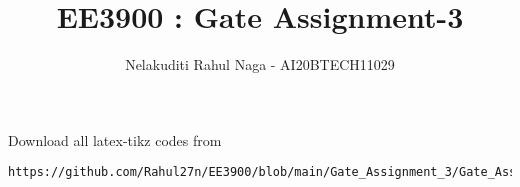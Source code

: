 \documentclass[journal,12pt,twocolumn]{IEEEtran}
\DeclareMathOperator*{\Res}{Res}
\begin{document}
\newcommand{\BEQA}{\begin{eqnarray}}
\newcommand{\EEQA}{\end{eqnarray}}
\newcommand{\define}{\stackrel{\triangle}{=}}

\raggedbottom
\setlength{\parindent}{0pt}
\providecommand{\mbf}{\mathbf}
\providecommand{\pr}[1]{\ensuremath{\Pr\left(#1\right)}}
\providecommand{\qfunc}[1]{\ensuremath{Q\left(#1\right)}}
\providecommand{\sbrak}[1]{\ensuremath{{}\left[#1\right]}}
\providecommand{\lsbrak}[1]{\ensuremath{{}\left[#1\right.}}
\providecommand{\rsbrak}[1]{\ensuremath{{}\left.#1\right]}}
\providecommand{\brak}[1]{\ensuremath{\left(#1\right)}}
\providecommand{\lbrak}[1]{\ensuremath{\left(#1\right.}}
\providecommand{\rbrak}[1]{\ensuremath{\left.#1\right)}}
\providecommand{\cbrak}[1]{\ensuremath{\left\{#1\right\}}}
\providecommand{\lcbrak}[1]{\ensuremath{\left\{#1\right.}}
\providecommand{\rcbrak}[1]{\ensuremath{\left.#1\right\}}}
\theoremstyle{remark}
\newtheorem{rem}{Remark}
\newcommand{\sgn}{\mathop{\mathrm{sgn}}}
\providecommand{\abs}[1]{\vert#1\vert}
\providecommand{\res}[1]{\Res\displaylimits_{#1}} 
\providecommand{\norm}[1]{\lVert#1\rVert}
\providecommand{\mtx}[1]{\mathbf{#1}}
\providecommand{\mean}[1]{E[ #1 ]}
\providecommand{\fourier}{\overset{\mathcal{F}}{ \rightleftharpoons}}
\providecommand{\system}{\overset{\mathcal{H}}{ \longleftrightarrow}}
\newcommand{\solution}{\noindent \textbf{Solution: }}
\newcommand{\cosec}{\,\text{cosec}\,}
\providecommand{\dec}[2]{\ensuremath{\overset{#1}{\underset{#2}{\gtrless}}}}
\newcommand{\myvec}[1]{\ensuremath{\begin{pmatrix}#1\end{pmatrix}}}
\newcommand{\mydet}[1]{\ensuremath{\begin{vmatrix}#1\end{vmatrix}}}
\makeatletter
{}
\makeatother
\let\StandardTheFigure\thefigure
\let\vec\mathbf
\renewcommand{\thefigure}{\theproblem}
\def\putbox#1#2#3{\makebox[0in][l]{\makebox[#1][l]{}\raisebox{\baselineskip}[0in][0in]{\raisebox{#2}[0in][0in]{#3}}}}
     \def\rightbox#1{\makebox[0in][r]{#1}}
     \def\centbox#1{\makebox[0in]{#1}}
     \def\topbox#1{\raisebox{-\baselineskip}[0in][0in]{#1}}
     \def\midbox#1{\raisebox{-0.5\baselineskip}[0in][0in]{#1}}
\vspace{3cm}
\title{ EE3900 : Gate Assignment-3}
\author{Nelakuditi Rahul Naga - AI20BTECH11029}
\maketitle
\newpage
\bigskip
\renewcommand{\thefigure}{\theenumi}
\renewcommand{\thetable}{\theenumi}
Download all latex-tikz codes from 
%
\begin{lstlisting}
https://github.com/Rahul27n/EE3900/blob/main/Gate_Assignment_3/Gate_Assignment_3.tex
\end{lstlisting}
\vspace{0.5cm}
\end{document}
